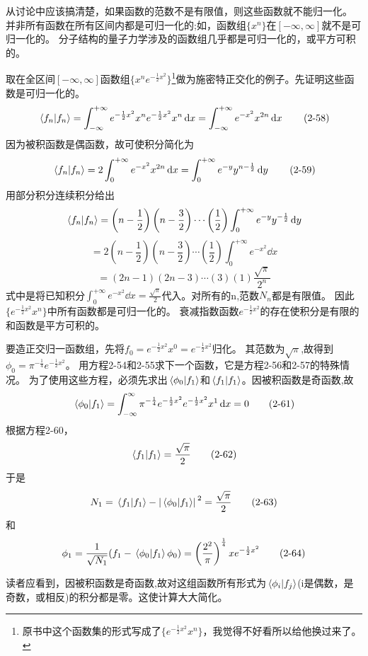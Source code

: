 从讨论中应该搞清楚，如果函数的范数不是有限值，则这些函数就不能归一化。
并非所有函数在所有区间内都是可归一化的;如，函数组$\{x^n\}$在$[-\infty,\infty]$就不是可归一化的。
分子结构的量子力学涉及的函数组几乎都是可归一化的，或平方可积的。

取在全区间$[-\infty,\infty]$函数组$\{x^ne^{-\frac{1}{2}x^2}\}$\footnote{原书中这个函数集的形式写成了$\{e^{-\frac{1}{2}x^2}x^n\}$，我觉得不好看所以给他换过来了。}做为施密特正交化的例子。先证明这些函数是可归一化的。
\[\bra*{f_n}\ket*{f_n}=\int_{-\infty}^{+\infty}e^{-\frac{1}{2}x^2}x^ne^{-\frac{1}{2}x^2}x^n\dd{x}=\int_{-\infty}^{+\infty}e^{-x^2}x^{2n}\dd{x} \tag{2-58}\]
因为被积函数是偶函数，故可使积分简化为
\[\bra*{f_n}\ket*{f_n}=2\int_{0}^{+\infty}e^{-x^2}x^{2n}\dd{x}=\int_{0}^{+\infty}e^{-y}y^{n-\frac{1}{2}}\dd{y} \tag{2-59}\]
用部分积分连续积分给出
\[\bra*{f_n}\ket*{f_n}=\left ( n-\frac{1}{2} \right )\left ( n-\frac{3}{2} \right ) \cdots \left ( \frac{1}{2} \right )\int_{0}^{+\infty}e^{-y}y^{-\frac{1}{2}}\dd{y}\]
\[=2\left ( n-\frac{1}{2} \right )\left ( n-\frac{3}{2} \right ) \cdots \left ( \frac{1}{2} \right )\int_{0}^{+\infty}e^{-x^2}\dd{x}\]
\[=(2n-1)(2n-3) \cdots (3)(1)\frac{\sqrt{\pi}}{2^n} \tag{2-60}\]
式中是将已知积分$\int_0^{+\infty}e^{-x^2}\dd{x}=\frac{\sqrt{\pi}}{2}$代入。对所有的n,范数$N_n$都是有限值。
因此$\{e^{-\frac{1}{2}x^2}x^n\}$中所有函数都是可归一化的。
衰减指数函数$e^{-\frac{1}{2}x^2}$的存在使积分是有限的和函数是平方可积的。

要造正交归一函数组，先将$f_0=e^{-\frac{1}{2}x^2}x^0=e^{-\frac{1}{2}x^2}$归化。
其范数为$\sqrt{\pi}$,故得到$\phi_0=\pi^{-\frac{1}{4}}e^{-\frac{1}{2}x^2}$。
用方程2-54和2-55求下一个函数，它是方程2-56和2-57的特殊情况。
为了使用这些方程，必须先求出$\bra*{\phi_0}\ket*{f_1}$和$\bra*{f_1}\ket*{f_1}$。因被积函数是奇函数,故
\[\bra*{\phi_0}\ket*{f_1}=\int_{-\infty}^{\infty}\pi^{-\frac{1}{4}}e^{-\frac{1}{2}x^2}e^{-\frac{1}{2}x^2}x^1\dd{x}=0 \tag{2-61}\]
根据方程2-60，
\[\bra*{f_1}\ket*{f_1}=\frac{\sqrt{\pi}}{2} \tag{2-62}\]
于是
\[N_1=\bra*{f_1}\ket*{f_1}-\abs*{\bra*{\phi_0}\ket*{f_1}}^2=\frac{\sqrt{\pi}}{2} \tag{2-63}\]
和
\[\phi_1=\frac{1}{\sqrt{N_1}}(f_1-\bra*{\phi_0}\ket*{f_1}\phi_0)=\left ( \frac{2^2}{\pi} \right )^{\frac{1}{4}}xe^{-\frac{1}{2}x^2} \tag{2-64}\]

读者应看到，因被积函数是奇函数,故对这组函数所有形式为$\bra*{\phi_i}\ket*{f_j}$(i是偶数，是奇数，或相反)的积分都是零。这使计算大大简化。

